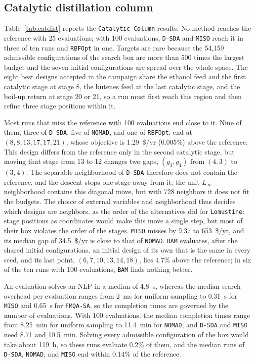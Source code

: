 \documentclass{article}
\begin{document}
\subsection{Catalytic distillation column}
\label{sec:catdist-results}
Table~\ref{tab:catdist} reports the \texttt{Catalytic Column} results.
No method reaches the reference with 25 evaluations; with 100 evaluations, \texttt{D-SDA} and \texttt{MISO} reach it in three of ten runs and \texttt{RBFOpt} in one.
Targets are rare because the 54,159 admissible configurations of the search box are more than 500 times the largest budget and the seven initial configurations are spread over the whole space.
The eight best designs accepted in the campaign share the ethanol feed and the first catalytic stage at stage 8, the butenes feed at the last catalytic stage, and the boil-up return at stage 20 or 21, so a run must first reach this region and then refine three stage positions within it.

Most runs that miss the reference with 100 evaluations end close to it.
Nine of them, three of \texttt{D-SDA}, five of \texttt{NOMAD}, and one of \texttt{RBFOpt}, end at \((8,8,13,17,17,21)\), whose objective is 1.29~\$/yr (0.005\%) above the reference.
This design differs from the reference only in the second catalytic stage, but moving that stage from 13 to 12 changes two gaps, \((g_3,g_4)\) from \((4,3)\) to \((3,4)\).
The separable neighborhood of \texttt{D-SDA} therefore does not contain the reference, and the descent stops one stage away from it; the unit \(L_\infty\) neighborhood contains this diagonal move, but with 728 neighbors it does not fit the budgets.
The choice of external variables and neighborhood thus decides which designs are neighbors, as the order of the alternatives did for \texttt{Lomustine}: stage positions as coordinates would make this move a single step, but most of their box violates the order of the stages.
\texttt{MISO} misses by 9.37 to 653~\$/yr, and its median gap of 34.5~\$/yr is close to that of \texttt{NOMAD}.
\texttt{BAM} evaluates, after the shared initial configurations, an initial design of its own that is the same in every seed, and its last point, \((6,7,10,13,14,18)\), lies 4.7\% above the reference; in six of the ten runs with 100 evaluations, \texttt{BAM} finds nothing better.

An evaluation solves an NLP in a median of 4.8~s, whereas the median search overhead per evaluation ranges from 2~ms for uniform sampling to 0.31~s for \texttt{MISO} and 0.65~s for \texttt{FMQA-SA}, so the completion times are governed by the number of evaluations.
With 100 evaluations, the median completion times range from 8.25~min for uniform sampling to 11.4~min for \texttt{NOMAD}, and \texttt{D-SDA} and \texttt{MISO} need 8.71 and 10.5~min.
Solving every admissible configuration of the box would take about 119~h, so these runs evaluate 0.2\% of them, and the median runs of \texttt{D-SDA}, \texttt{NOMAD}, and \texttt{MISO} end within 0.14\% of the reference.
\end{document}
